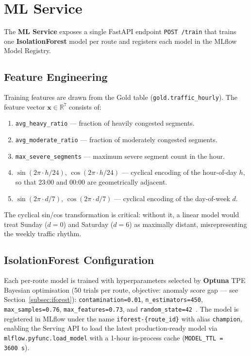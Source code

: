 \section{ML Service}
\label{sec:impl-ml}

The \textbf{ML Service} exposes a single FastAPI endpoint \texttt{POST /train}
that trains one \textbf{IsolationForest} model per route and registers each
model in the MLflow Model Registry.

\subsection{Feature Engineering}

Training features are drawn from the Gold table
(\texttt{gold.traffic\_hourly}). The feature vector $\mathbf{x} \in
\mathbb{R}^7$ consists of:

\begin{enumerate}
  \item \texttt{avg\_heavy\_ratio} --- fraction of heavily congested segments.
  \item \texttt{avg\_moderate\_ratio} --- fraction of moderately congested segments.
  \item \texttt{max\_severe\_segments} --- maximum severe segment count in the hour.
  \item $\sin(2\pi \cdot h / 24)$, $\cos(2\pi \cdot h / 24)$ --- cyclical
        encoding of the hour-of-day $h$, so that 23:00 and 00:00 are
        geometrically adjacent.
  \item $\sin(2\pi \cdot d / 7)$, $\cos(2\pi \cdot d / 7)$ --- cyclical
        encoding of the day-of-week $d$.
\end{enumerate}

\noindent The cyclical sin/cos transformation is critical: without it, a
linear model would treat Sunday ($d=0$) and Saturday ($d=6$) as maximally
distant, misrepresenting the weekly traffic rhythm.

\subsection{IsolationForest Configuration}

Each per-route model is trained with hyperparameters selected by
\textbf{Optuna} TPE Bayesian optimisation (50 trials per route,
objective: anomaly score gap — see Section~\ref{subsec:iforest}):
\texttt{contamination=0.01}, \texttt{n\_estimators=450},
\texttt{max\_samples=0.76}, \texttt{max\_features=0.73}, and
\texttt{random\_state=42}~\cite{liu2008isolation, optuna_paper}.
The model is registered in MLflow under the name
\texttt{iforest-\{route\_id\}} with alias \texttt{champion}, enabling
the Serving API to load the latest production-ready model via
\texttt{mlflow.pyfunc.load\_model} with a 1-hour in-process cache
(\texttt{MODEL\_TTL = 3600~s}).

